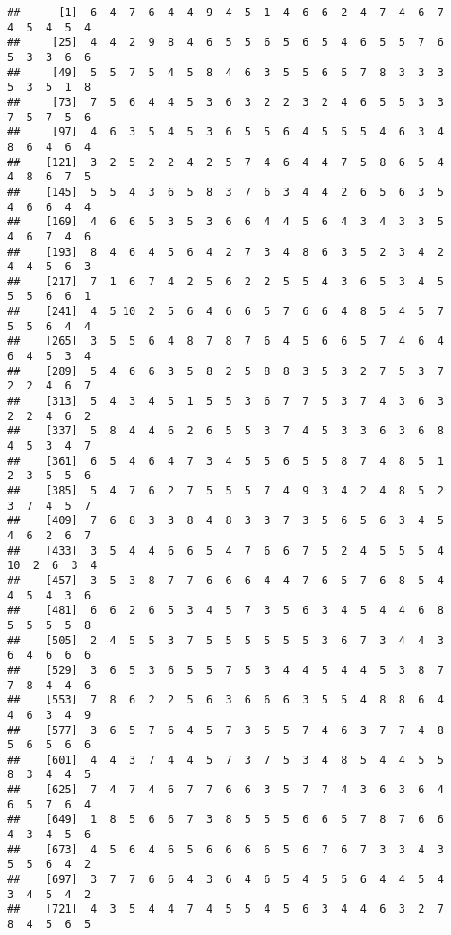 \documentclass[
]{book}
\begin{document}
\begin{verbatim}
##      [1]  6  4  7  6  4  4  9  4  5  1  4  6  6  2  4  7  4  6  7  4  5  4  5  4
##     [25]  4  4  2  9  8  4  6  5  5  6  5  6  5  4  6  5  5  7  6  5  3  3  6  6
##     [49]  5  5  7  5  4  5  8  4  6  3  5  5  6  5  7  8  3  3  3  5  3  5  1  8
##     [73]  7  5  6  4  4  5  3  6  3  2  2  3  2  4  6  5  5  3  3  7  5  7  5  6
##     [97]  4  6  3  5  4  5  3  6  5  5  6  4  5  5  5  4  6  3  4  8  6  4  6  4
##    [121]  3  2  5  2  2  4  2  5  7  4  6  4  4  7  5  8  6  5  4  4  8  6  7  5
##    [145]  5  5  4  3  6  5  8  3  7  6  3  4  4  2  6  5  6  3  5  4  6  6  4  4
##    [169]  4  6  6  5  3  5  3  6  6  4  4  5  6  4  3  4  3  3  5  4  6  7  4  6
##    [193]  8  4  6  4  5  6  4  2  7  3  4  8  6  3  5  2  3  4  2  4  4  5  6  3
##    [217]  7  1  6  7  4  2  5  6  2  2  5  5  4  3  6  5  3  4  5  5  5  6  6  1
##    [241]  4  5 10  2  5  6  4  6  6  5  7  6  6  4  8  5  4  5  7  5  5  6  4  4
##    [265]  3  5  5  6  4  8  7  8  7  6  4  5  6  6  5  7  4  6  4  6  4  5  3  4
##    [289]  5  4  6  6  3  5  8  2  5  8  8  3  5  3  2  7  5  3  7  2  2  4  6  7
##    [313]  5  4  3  4  5  1  5  5  3  6  7  7  5  3  7  4  3  6  3  2  2  4  6  2
##    [337]  5  8  4  4  6  2  6  5  5  3  7  4  5  3  3  6  3  6  8  4  5  3  4  7
##    [361]  6  5  4  6  4  7  3  4  5  5  6  5  5  8  7  4  8  5  1  2  3  5  5  6
##    [385]  5  4  7  6  2  7  5  5  5  7  4  9  3  4  2  4  8  5  2  3  7  4  5  7
##    [409]  7  6  8  3  3  8  4  8  3  3  7  3  5  6  5  6  3  4  5  4  6  2  6  7
##    [433]  3  5  4  4  6  6  5  4  7  6  6  7  5  2  4  5  5  5  4 10  2  6  3  4
##    [457]  3  5  3  8  7  7  6  6  6  4  4  7  6  5  7  6  8  5  4  4  5  4  3  6
##    [481]  6  6  2  6  5  3  4  5  7  3  5  6  3  4  5  4  4  6  8  5  5  5  5  8
##    [505]  2  4  5  5  3  7  5  5  5  5  5  5  3  6  7  3  4  4  3  6  4  6  6  6
##    [529]  3  6  5  3  6  5  5  7  5  3  4  4  5  4  4  5  3  8  7  7  8  4  4  6
##    [553]  7  8  6  2  2  5  6  3  6  6  6  3  5  5  4  8  8  6  4  4  6  3  4  9
##    [577]  3  6  5  7  6  4  5  7  3  5  5  7  4  6  3  7  7  4  8  5  6  5  6  6
##    [601]  4  4  3  7  4  4  5  7  3  7  5  3  4  8  5  4  4  5  5  8  3  4  4  5
##    [625]  7  4  7  4  6  7  7  6  6  3  5  7  7  4  3  6  3  6  4  6  5  7  6  4
##    [649]  1  8  5  6  6  7  3  8  5  5  5  6  6  5  7  8  7  6  6  4  3  4  5  6
##    [673]  4  5  6  4  6  5  6  6  6  6  5  6  7  6  7  3  3  4  3  5  5  6  4  2
##    [697]  3  7  7  6  6  4  3  6  4  6  5  4  5  5  6  4  4  5  4  3  4  5  4  2
##    [721]  4  3  5  4  4  7  4  5  5  4  5  6  3  4  4  6  3  2  7  8  4  5  6  5

\end{verbatim}
\end{document}
